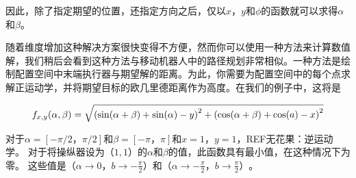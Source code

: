 

因此，除了指定期望的位置，还指定方向之后，仅以$x$，$y$和$\phi$的函数就可以求得$\alpha$和$\beta$。

随着维度增加这种解决方案很快变得不方便，然而你可以使用一种方法来计算数值解，我们稍后会看到这种方法与移动机器人中的路径规划非常相似。一种方法是绘制配置空间中末端执行器与期望解的距离。为此，你需要为配置空间中的每个点求解正运动学，并将期望目标的欧几里德距离作为高度。在我们的例子中，这将是

\begin{equation}
\small
f_{x,y}(\alpha,\beta)=\sqrt{\left(\sin(\alpha + \beta) + \sin(\alpha) - y\right)^2 + \left(\cos(\alpha+\beta)+\cos(a) - x\right)^2}
\end{equation}


对于$ \alpha = [ - \pi / 2，\pi / 2] $和$ \beta = [ - \pi，\pi] $和$ x = 1 $，$ y = 1 $，REF{无花果：逆运动学}。 对于将操纵器设为$（1,1）$的$ \alpha $和$ \beta $的值，此函数具有最小值，在这种情况下为零。 这些值是$（\alpha \rightarrow 0，b \rightarrow - \frac {\pi} {2}）$和$（\alpha \rightarrow - \frac {\pi} {2}，b \rightarrow \frac {\pi} {2}）$。


